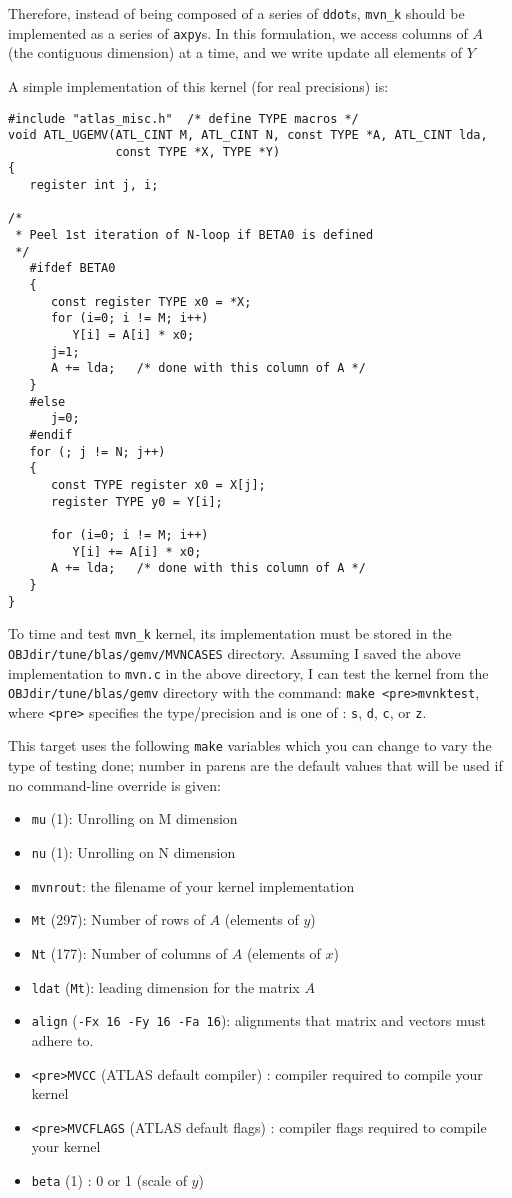 \documentclass[11pt]{article}
\newcommand{\kernk}[1]{{\tt #1\_k}}
\begin{document}
Therefore, instead of being composed of a series of {\tt ddot}s, 
\kernk{mvn} should be implemented as a series of {\tt axpy}s.  In this
formulation, we access columns of $A$ (the contiguous dimension) at a time,
and we write update all elements of $Y$ 

A simple implementation of this kernel (for real precisions) is:
\begin{verbatim}
#include "atlas_misc.h"  /* define TYPE macros */
void ATL_UGEMV(ATL_CINT M, ATL_CINT N, const TYPE *A, ATL_CINT lda,
               const TYPE *X, TYPE *Y)
{
   register int j, i;

/*
 * Peel 1st iteration of N-loop if BETA0 is defined
 */
   #ifdef BETA0
   {
      const register TYPE x0 = *X;
      for (i=0; i != M; i++)
         Y[i] = A[i] * x0;
      j=1;
      A += lda;   /* done with this column of A */
   }
   #else
      j=0;
   #endif
   for (; j != N; j++)
   {
      const TYPE register x0 = X[j];
      register TYPE y0 = Y[i];

      for (i=0; i != M; i++) 
         Y[i] += A[i] * x0;
      A += lda;   /* done with this column of A */
   }
}
\end{verbatim}

To time and test \kernk{mvn} kernel, its implementation must be stored in 
the\\ {\tt OBJdir/tune/blas/gemv/MVNCASES} directory.  Assuming I saved the
above implementation to {\tt mvn.c} in the above directory, I can test
the kernel from the {\tt OBJdir/tune/blas/gemv} directory with the
command: \verb+make <pre>mvnktest+, where \verb+<pre>+ specifies the
type/precision and is one of : {\tt s}, {\tt d}, {\tt c}, or {\tt z}.

This target uses the following {\tt make} variables which you can change
to vary the type of testing done; number in parens are the default values
that will be used if no command-line override is given:
\begin{itemize}
\item \verb+mu+ (1): Unrolling on M dimension
\item \verb+nu+ (1): Unrolling on N dimension
\item \verb+mvnrout+: the filename of your kernel implementation
\item \verb+Mt+ (297): Number of rows of $A$ (elements of $y$)
\item \verb+Nt+ (177): Number of columns of $A$ (elements of $x$)
\item \verb+ldat+ (\verb+Mt+): leading dimension for the matrix $A$
\item \verb+align+ (\verb+-Fx 16 -Fy 16 -Fa 16+): alignments that
      matrix and vectors must adhere to.
\item \verb+<pre>MVCC+ (ATLAS default compiler) : compiler required
      to compile your kernel
\item \verb+<pre>MVCFLAGS+ (ATLAS default flags) : compiler flags required
      to compile your kernel
\item \verb+beta+ (1) : 0 or 1 (scale of $y$)
\end{itemize}
\end{document}
